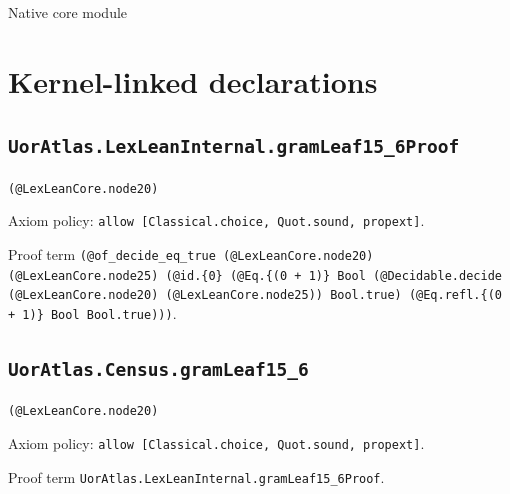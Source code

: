 \documentclass[11pt]{article}
\begin{document}
\begin{center}{\LARGE Native core module}\end{center}
\section*{Kernel-linked declarations}
\subsection*{\texttt{UorAtlas.LexLeanInternal.gramLeaf15\_6Proof}}
\noindent\texttt{(@LexLeanCore.node20)}\par
\noindent Axiom policy: \texttt{allow [Classical.choice, Quot.sound, propext]}.\par
\noindent Proof term \texttt{(@of\_decide\_eq\_true (@LexLeanCore.node20) (@LexLeanCore.node25) (@id.\{0\} (@Eq.\{(0 + 1)\} Bool (@Decidable.decide (@LexLeanCore.node20) (@LexLeanCore.node25)) Bool.true) (@Eq.refl.\{(0 + 1)\} Bool Bool.true)))}.\par
\subsection*{\texttt{UorAtlas.Census.gramLeaf15\_6}}
\noindent\texttt{(@LexLeanCore.node20)}\par
\noindent Axiom policy: \texttt{allow [Classical.choice, Quot.sound, propext]}.\par
\noindent Proof term \texttt{UorAtlas.LexLeanInternal.gramLeaf15\_6Proof}.\par
\end{document}
